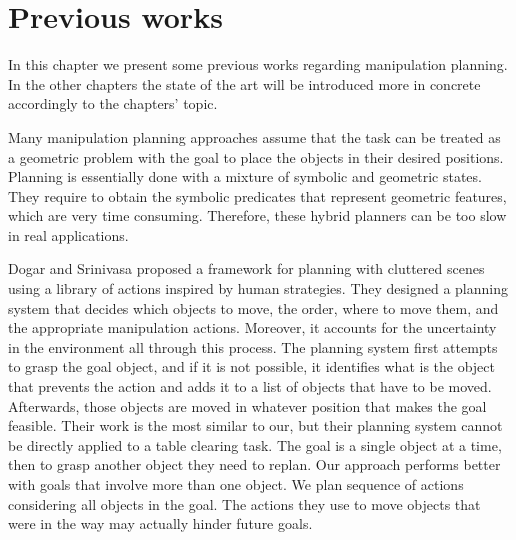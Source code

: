 \chapter{Previous works}
\label{ch:state_of_the_art}
In this chapter we present some previous works regarding manipulation planning. In the other chapters the state of the art will be introduced more in concrete accordingly to the chapters' topic.

Many manipulation planning approaches\citep{PlanningAlgorithms} assume that the task can be treated as a geometric problem with the goal to place the objects in their desired positions. Planning is essentially done with a mixture %
of symbolic and geometric states. They require to obtain the symbolic predicates that represent geometric features, which are very time consuming. Therefore, these hybrid planners can be too slow in real applications.  



Dogar and Srinivasa \cite{Dogar2011} proposed a framework for planning with cluttered scenes using a library of actions inspired by human strategies. They designed a planning system that decides which
objects to move, the order, where to move them, and the appropriate manipulation actions. Moreover, it accounts for the uncertainty
in the environment all through this process. 
The planning system first attempts to grasp the goal object, and if it is not possible, it identifies what is the object that prevents the action and adds it to a list of objects that have to be moved. Afterwards, those objects are moved in whatever position that makes the goal feasible. 
Their work is the most similar to our, but their planning system cannot be directly applied to a table clearing task. The goal is a single object at a time, then to grasp another object they need to replan. Our approach performs better with goals that involve more than one object. We plan sequence of actions considering all objects in the goal. The actions they use to move objects that were in the way may actually hinder future goals.

